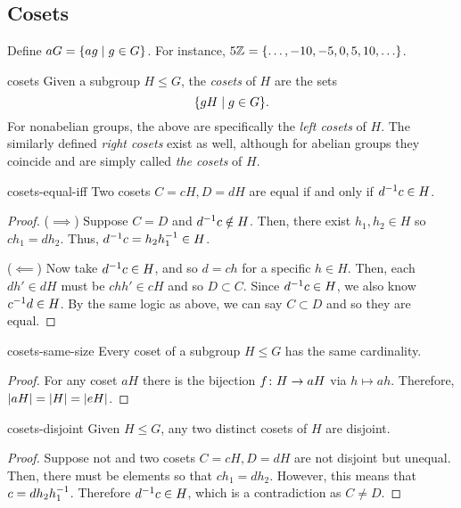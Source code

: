 \documentclass{article}
\begin{document}
\subsection{Cosets}

Define $aG = \lbrace ag \mid g \in G \rbrace$.
For instance, $5\mathbb{Z}^{} = \lbrace \ldots, -10, -5, 0, 5, 10, \ldots \rbrace$.

\begin{definition}{}{cosets}
  Given a subgroup $H \le G$, the \emph{cosets} of $H$ are the sets
  \[ \lbrace gH \mid g \in G \rbrace. \]
  For nonabelian groups, the above are specifically the \emph{left cosets} of $H$.
  The similarly defined \emph{right cosets} exist as well, although for abelian groups
  they coincide and are simply called \emph{the cosets} of $H$.
\end{definition}

\begin{theorem}{}{cosets-equal-iff}
  Two cosets $C = cH, D = dH$ are equal if and only if $d^{-1} c \in H$.
\end{theorem}
\begin{proof}
  ($\implies$)
  Suppose $C = D$ and $d^{-1} c \notin H$.
  Then, there exist $h_{1},h_{2} \in H$ so $ch_{1} = dh_{2}$.
  Thus, $d^{-1} c = h_{2}h_{1}^{-1} \in H$.

  ($\impliedby$)
  Now take $d^{-1} c \in H$, and so $d = ch$ for a specific $h \in H$.
  Then, each $dh' \in dH$ must be $chh' \in cH$ and so $D \subset C$.
  Since $d^{-1} c \in H$, we also know $c ^{-1} d \in H$.
  By the same logic as above, we can say $C \subset D$ and so they are equal.
\end{proof}

\begin{proposition}{}{cosets-same-size}
  Every coset of a subgroup $H \le G$ has the same cardinality.
\end{proposition}
\begin{proof}
  For any coset $aH$ there is the bijection $f \colon H \to aH$ via $h \mapsto ah$.
  Therefore, $\lvert aH\rvert = \lvert H\rvert = \lvert eH\rvert$.
\end{proof}

\begin{proposition}{}{cosets-disjoint}
  Given $H \le G$, any two distinct cosets of $H$ are disjoint.
\end{proposition}
\begin{proof}
  Suppose not and two cosets $C = cH, D = dH$ are not disjoint but unequal.
  Then, there must be elements so that $ch_{1} = dh_{2}$.
  However, this means that $c = dh_{2}h_{1}^{-1}$.
  Therefore $d^{-1} c \in H$, which is a contradiction as $C \ne D$.
\end{proof}
\end{document}
